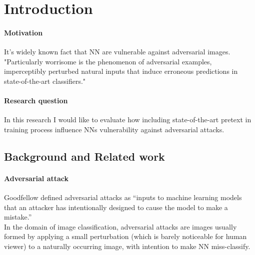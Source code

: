 \section{Introduction}


\paragraph{Motivation}
It’s widely known fact that NN are vulnerable against adversarial images.
~\cite{ilyas2019adversarial} "Particularly worrisome is the phenomenon of adversarial examples,
imperceptibly perturbed natural inputs that induce erroneous predictions in state-of-the-art classifiers."


\paragraph{Research question}
In this research I would like to evaluate how including state-of-the-art pretext in training process influence
NNs vulnerability against adversarial attacks.


\subsection{Background and Related work}

\paragraph{Adversarial attack}
Goodfellow defined adversarial attacks as “inputs to machine learning models that an
attacker has intentionally designed to cause the model to make a mistake.” ~\cite{DBLP:journals/corr/abs-1802-08195} \\
In the domain of image classification, adversarial attacks are images usually formed by applying a small perturbation
(which is barely noticeable for human viewer) to a naturally occurring image, with intention to make NN miss-classify.

